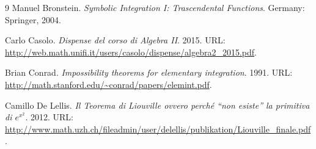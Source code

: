 \documentclass[11pt]{article}
\theoremstyle{plain}
\theoremstyle{definition}
\theoremstyle{remark}
\begin{document}
\begin{thebibliography}{9}
Manuel Bronstein. \emph{Symbolic Integration I: Trascendental
Functions}. Germany: Springer, 2004.

Carlo Casolo. \emph{Dispense del corso di Algebra II}. 2015. URL:
\url{http://web.math.unifi.it/users/casolo/dispense/algebra2_2015.pdf}.

Brian Conrad. \emph{Impossibility theorems for elementary integration}.
1991. URL: \url{http://math.stanford.edu/~conrad/papers/elemint.pdf}.

Camillo De Lellis. \emph{Il Teorema di Liouville ovvero perch\'e ``non
esiste'' la primitiva di $e^{x^{2}}$}. 2012. URL:
\url{http://www.math.uzh.ch/fileadmin/user/delellis/publikation/Liouville_finale.pdf}.
\end{thebibliography}
\end{document}
